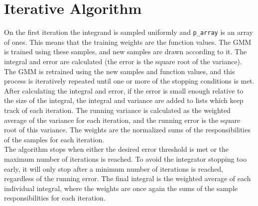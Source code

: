 \documentclass{article}
\begin{document}
\section{Iterative Algorithm}

On the first iteration the integrand is sampled uniformly and \texttt{p\_array}
is an array of ones. This means that the training weights are the function
values. The GMM is trained using these samples, and new samples are drawn according
to it. The integral and error are calculated (the error is the square root of
the variance). The GMM is retrained using the new samples and function values,
and this process is iteratively repeated until one or more of the stopping
conditions is met. \\

After calculating the integral and error, if the error is small enough relative
to the size of the integral, the integral and variance are added to lists which
keep track of each iteration. The running variance is calculated as the weighted
average of the variance for each iteration, and the running error is the square
root of this variance. The weights are the normalized sums of the
responsibilities of the samples for each iteration. \\

The algorithm stops when either the desired error threshold is met or the
maximum number of iterations is reached. To avoid the integrator stopping too
early, it will only stop after a minimum number of iterations is reached,
regardless of the running error. The final integral is the weighted average
of each individual integral, where the weights are once again the sums of the
sample responsibilities for each iteration.
\end{document}
